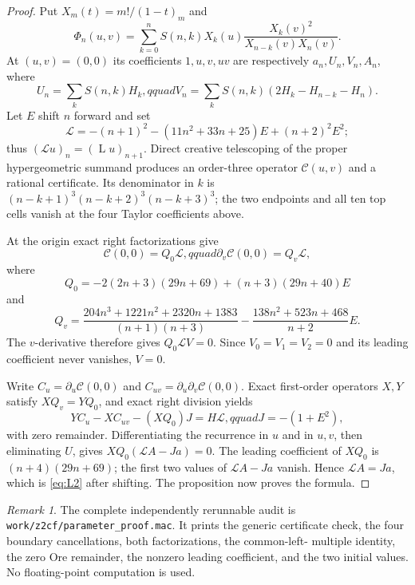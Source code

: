 \documentclass[11pt]{article}
\theoremstyle{remark}
\newtheorem{remark}{Remark}
\DeclareMathOperator{\Lop}{L}
\begin{document}
\begin{proof}
Put $X_m(t)=m!/(1-t)_m$ and
\[
 \Phi_n(u,v)=\sum_{k=0}^nS(n,k)X_k(u)
 \frac{X_k(v)^2}{X_{n-k}(v)X_n(v)}.
\]
At $(u,v)=(0,0)$ its coefficients $1,u,v,uv$ are respectively
$a_n,U_n,V_n,A_n$, where
\[
 U_n=\sum_kS(n,k)H_k,qquad
 V_n=\sum_kS(n,k)(2H_k-H_{n-k}-H_n).
\]
Let $E$ shift $n$ forward and set
\[
 \mathcal L=-(n+1)^2-(11n^2+33n+25)E+(n+2)^2E^2;
\]
thus $(\mathcal Lu)_n=(\Lop u)_{n+1}$.  Direct creative telescoping of the
proper hypergeometric summand produces an order-three operator
$\mathcal C(u,v)$ and a rational certificate.  Its denominator in $k$ is
$(n-k+1)^3(n-k+2)^3(n-k+3)^3$; the two endpoints and all ten top cells vanish
at the four Taylor coefficients above.

At the origin exact right factorizations give
\[
 \mathcal C(0,0)=Q_0\mathcal L,qquad
 \partial_v\mathcal C(0,0)=Q_v\mathcal L,
\]
where
\[
 Q_0=-2(2n+3)(29n+69)+(n+3)(29n+40)E
\]
and
\[
 Q_v=\frac{204n^3+1221n^2+2320n+1383}{(n+1)(n+3)}
 -\frac{138n^2+523n+468}{n+2}E.
\]
The $v$-derivative therefore gives $Q_0\mathcal LV=0$.  Since
$V_0=V_1=V_2=0$ and its leading coefficient never vanishes, $V=0$.

Write $C_u=\partial_u\mathcal C(0,0)$ and
$C_{uv}=\partial_u\partial_v\mathcal C(0,0)$.  Exact first-order operators
$X,Y$ satisfy $XQ_v=YQ_0$, and exact right division yields
\[
 YC_u-XC_{uv}-(XQ_0)J=H\mathcal L,qquad J=-(1+E^2),
\]
with zero remainder.  Differentiating the recurrence in $u$ and in $u,v$,
then eliminating $U$, gives
$XQ_0(\mathcal LA-Ja)=0$.  The leading coefficient of $XQ_0$ is
$(n+4)(29n+69)$; the first two values of $\mathcal LA-Ja$ vanish.  Hence
$\mathcal LA=Ja$, which is \eqref{eq:L2} after shifting.  The proposition now
proves the formula.
\end{proof}

\begin{remark}
The complete independently rerunnable audit is
\texttt{work/z2cf/parameter\_proof.mac}.  It prints the generic certificate
check, the four boundary cancellations, both factorizations, the common-left-
multiple identity, the zero Ore remainder, the nonzero leading coefficient,
and the two initial values.  No floating-point computation is used.
\end{remark}
\end{document}
